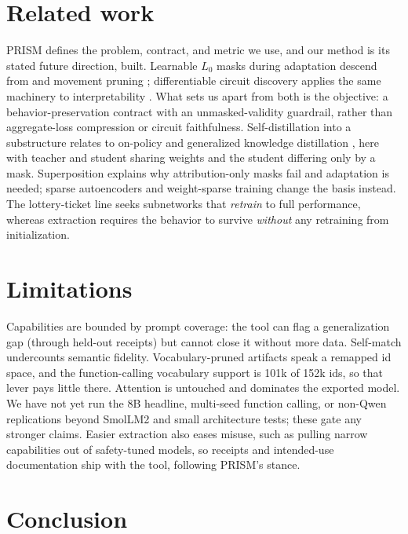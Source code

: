 \documentclass{article}
\begin{document}
\section{Related work}

PRISM \citep{prism2026} defines the problem, contract, and metric we use, and
our method is its stated future direction, built. Learnable $L_0$ masks during
adaptation descend from \citet{louizos2018} and movement pruning
\citep{sanh2020movement}; differentiable circuit discovery applies the same
machinery to interpretability \citep{bhaskar2024edge, conmy2023acdc}. What
sets us apart from both is the objective: a behavior-preservation contract
with an unmasked-validity guardrail, rather than aggregate-loss compression or
circuit faithfulness. Self-distillation into a substructure relates to
on-policy and generalized knowledge distillation \citep{hinton2015,
agarwal2024gkd}, here with teacher and student sharing weights and the student
differing only by a mask. Superposition \citep{elhage2022superposition}
explains why attribution-only masks fail and adaptation is needed; sparse
autoencoders \citep{cunningham2023sae} and weight-sparse training
\citep{gao2025weightsparse} change the basis instead. The lottery-ticket line
\citep{frankle2019lottery} seeks subnetworks that \emph{retrain} to full
performance, whereas extraction requires the behavior to survive
\emph{without} any retraining from initialization.

\section{Limitations}

Capabilities are bounded by prompt coverage: the tool can flag a
generalization gap (through held-out receipts) but cannot close it without
more data. Self-match undercounts semantic fidelity. Vocabulary-pruned
artifacts speak a remapped id space, and the function-calling vocabulary
support is 101k of 152k ids, so that lever pays little there. Attention is
untouched and dominates the exported model. We have not yet run the 8B
headline, multi-seed function calling, or non-Qwen replications beyond SmolLM2
and small architecture tests; these gate any stronger claims. Easier
extraction also eases misuse, such as pulling narrow capabilities out of
safety-tuned models, so receipts and intended-use documentation ship with the
tool, following PRISM's stance.

\section{Conclusion}
\end{document}
